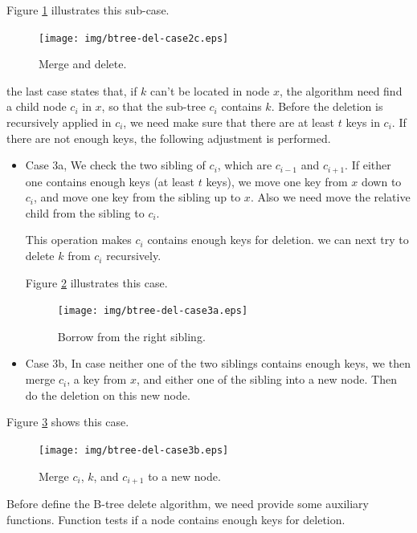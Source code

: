 \documentclass[b5paper]{article}
\begin{document}
Figure \ref{fig:btree-del-case2c} illustrates this sub-case.

\begin{figure}[htbp]
  \centering
    \texttt{[image: img/btree-del-case2c.eps]}
    \caption{Merge and delete.} \label{fig:btree-del-case2c}
\end{figure}

the last case states that, if $k$ can't be located in node $x$, the algorithm
need find a child node $c_i$ in $x$, so that the sub-tree $c_i$
contains $k$. Before the deletion is recursively applied in $c_i$, we
need make sure that there are at least $t$ keys in $c_i$. If there are
not enough keys, the following adjustment is performed.

\begin{itemize}
\item Case 3a, We check the two sibling of $c_i$, which are $c_{i-1}$ and $c_{i+1}$.
If either one contains enough keys (at least $t$ keys), we move
one key from $x$ down to $c_i$, and move one key from the sibling up to
$x$. Also we need move the relative child from the sibling to $c_i$.

This operation makes $c_i$ contains enough keys for deletion. we can
next try to delete $k$ from $c_i$ recursively.

Figure \ref{fig:btree-del-case3a} illustrates this case.

\begin{figure}[htbp]
  \centering
    \texttt{[image: img/btree-del-case3a.eps]}
    \caption{Borrow from the right sibling.}
    \label{fig:btree-del-case3a}
\end{figure}

\item Case 3b, In case neither one of the two siblings contains enough keys, we then
merge $c_i$, a key from $x$, and either one of the sibling into a new
node. Then do the deletion on this new node.
\end{itemize}

Figure \ref{fig:btree-del-case3b} shows this case.

\begin{figure}[htbp]
  \centering
    \texttt{[image: img/btree-del-case3b.eps]}
    \caption{Merge $c_i$, $k$, and $c_{i+1}$ to a new node.}
    \label{fig:btree-del-case3b}
\end{figure}

Before define the B-tree delete algorithm, we need provide some auxiliary
functions. Function  tests if a node contains enough keys
for deletion.
\end{document}
